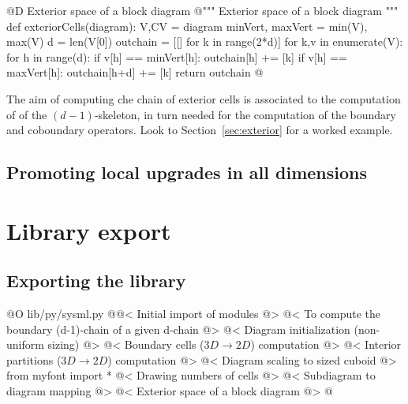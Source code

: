 \documentclass[11pt,oneside]{article}	%
\begin{document}
@D Exterior space of a block diagram
@{""" Exterior space of a block diagram """
def exteriorCells(diagram):
	V,CV = diagram
	minVert, maxVert = min(V), max(V)
	d = len(V[0])
	outchain = [[] for k in range(2*d)]
	for k,v in enumerate(V):
		for h in range(d):
			if v[h] == minVert[h]: outchain[h] += [k]
			if v[h] == maxVert[h]: outchain[h+d] += [k]
	return outchain
@}

The aim of computing che chain of exterior cells is associated to the computation of 
of the $(d-1)$-skeleton, in turn needed for the computation of the boundary and coboundary operators.
Look to Section~\ref{sec:exterior} for a worked example.



\subsection{Promoting local upgrades in all dimensions}



\section{Library export}
\subsection{Exporting the library}

@O lib/py/sysml.py
@{@< Initial import of modules @>
@< To compute the boundary (d-1)-chain of a given d-chain @>
@< Diagram initialization (non-uniform sizing) @>
@< Boundary cells ($3D\to 2D$) computation @>
@< Interior partitions ($3D\to 2D$) computation @>
@< Diagram scaling to sized cuboid @>
from myfont import *
@< Drawing numbers of cells @>
@< Subdiagram to diagram mapping @>
@< Exterior space of a block diagram @>
@}
\end{document}
